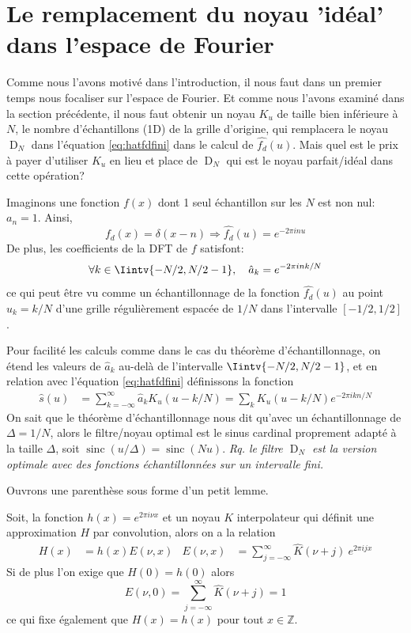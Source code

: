\documentclass[11pt,twoside]{article}
\DeclareMathOperator{\sinc}{sinc}
\DeclareMathOperator{\D}{D}
\begin{document}
\section{Le remplacement du noyau 'idéal' dans l'espace de Fourier}
\label{sec:DNapprox}
%
Comme nous l'avons motivé dans l'introduction, il nous faut dans un premier temps nous focaliser sur l'espace de Fourier. Et comme nous l'avons examiné dans la section précédente, il nous faut obtenir un noyau $K_u$ de taille bien inférieure à $N$, le nombre d'échantillons (1D) de la grille d'origine, qui remplacera le noyau $\D_N$ dans l'équation \ref{eq:hatfdfini} dans le calcul de $\hat{f_d}(u)$. Mais quel est le prix à payer d'utiliser $K_u$ en lieu et place de $\D_N$ qui est le noyau parfait/idéal dans cette opération?

Imaginons une fonction $f(x)$ dont 1 seul échantillon sur les $N$ est non nul: $a_n=1$. Ainsi, 
\begin{equation}
f_d(x) = \delta(x-n) \Rightarrow \hat{f_d}(u) = e^{-2\pi i n u}
\end{equation} 
De plus, les coefficients de la DFT de $f$ satisfont:
\begin{equation}
\forall k\in\Iintv{-N/2,N/2-1},\quad \hat{a}_k = e^{-2\pi i n k/N}
\end{equation}
ce qui peut être vu comme un échantillonnage de la fonction $\hat{f_d}(u)$ au point $u_k=k/N$ d'une grille régulièrement espacée de $1/N$ dans l'intervalle $[-1/2,1/2]$. 

Pour facilité les calculs comme dans le cas du théorème d'échantillonnage, on étend les valeurs de $ \hat{a}_k$ au-delà de l'intervalle $\Iintv{-N/2,N/2-1}$, et en relation avec l'équation \ref{eq:hatfdfini} définissons la fonction
\begin{align}
\hat{s}(u) &= \sum_{k=-\infty}^{\infty} \hat{a}_k K_u(u-k/N) = \sum_k K_u(u-k/N) e^{-2\pi i k n/N}
\label{eq:Su1}
\end{align}
On sait que le théorème d'échantillonnage nous dit qu'avec un échantillonnage de $\Delta=1/N$, alors le filtre/noyau optimal est le sinus cardinal proprement adapté à la taille $\Delta$, soit $\sinc(u/\Delta)=\sinc(Nu)$. \textit{Rq. le filtre $\D_N$ est la version optimale avec des fonctions échantillonnées sur un intervalle fini.}


Ouvrons une parenthèse sous forme d'un petit lemme. 
\begin{lemme}
Soit, la fonction  $h(x)=e^{2\pi i \nu x}$ et un noyau $K$ interpolateur qui définit une approximation $H$ par convolution, alors on a la relation
\begin{align} 
H(x) &= 	h(x) E(\nu,x) &  E(\nu,x)&=\sum_{j=-\infty}^\infty \hat{K}(\nu+j)\  e^{2\pi i jx}
\end{align}
Si de plus l'on exige que $H(0)=h(0)$ alors
\begin{equation}
E(\nu,0)=\sum_{j=-\infty}^\infty \hat{K}(\nu+j) = 1
\label{eq:hatKclosure}
\end{equation}
ce qui fixe également que $H(x)=h(x)$ pour tout $x\in\mathbb{Z}$.
\label{lem:interpSinusoide}
\end{lemme}
\end{document}

